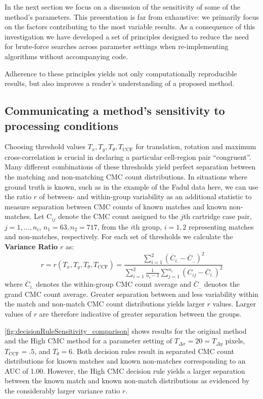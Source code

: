 In the next section we focus on a discussion of the sensitivity of some
of the method's parameters. This presentation is far from exhaustive: we
primarily focus on the factors contributing to the most variable
results. As a consequence of this investigation we have developed a set
of principles designed to reduce the need for brute-force searches
across parameter settings when re-implementing algorithms without
accompanying code.

Adherence to these principles yields not only computationally
reproducible results, but also improves a reader's understanding of a
proposed method.

\hypertarget{communicating-a-methods-sensitivity-to-processing-conditions}{%
\subsection{Communicating a method's sensitivity to processing
conditions}\label{communicating-a-methods-sensitivity-to-processing-conditions}}

Choosing threshold values \(T_x, T_y, T_\theta, T_{\text{CCF}}\) for
translation, rotation and maximum cross-correlation is crucial in
declaring a particular cell-region pair ``congruent''. Many different
combinations of these thresholds yield perfect separation between the
matching and non-matching CMC count distributions. In situations where
ground truth is known, such as in the example of the Fadul data here, we
can use the ratio \(r\) of between- and within-group variability as an
additional statistic to measure separation between CMC counts of known
matches and known non-matches. Let C\(_{ij}\) denote the CMC count
assigned to the \(j\)th cartridge case pair, \(j = 1,...,n_i\),
\(n_1 = 63, n_2 = 717\), from the \(i\)th group, \(i = 1,2\)
representing matches and non-matches, respectively. For each set of
thresholds we calculate the \textbf{Variance Ratio} \(r\) as: \[
r = r\left(T_x, T_y, T_\theta, T_{\text{CCF}}\right) = \frac{\sum_{i=1}^2 \left(\overline{C}_{i.} - \overline{C}_{..}\right)^2}{\sum_{i=1}^2 \frac{1}{n_i - 1}\sum_{j=1}^{n_i} \left(C_{ij} - \overline{C}_{i.}\right)^2}
\] where \(\overline{C}_{i.}\) denotes the within-group CMC count
average and \(\overline{C}_{..}\) denotes the grand CMC count average.
Greater separation between and less variability within the match and
non-match CMC count distributions yields larger \(r\) values. Larger
values of \(r\) are therefore indicative of greater separation between
the groups.

\autoref{fig:decisionRuleSensitivity_comparison} shows results for the
original method and the High CMC method for a parameter setting of
\(T_{\Delta x} = 20 = T_{\Delta y}\) pixels, \(T_{\text{CCF}} = .5\),
and \(T_{\theta} = 6\). Both decision rules result in separated CMC
count distributions for known matches and known non-matches
corresponding to an AUC of 1.00. However, the High CMC decision rule
yields a larger separation between the known match and known non-match
distributions as evidenced by the considerably larger variance ratio
\(r\).

